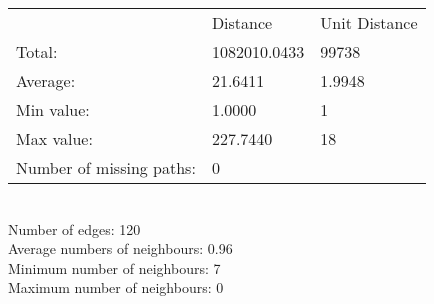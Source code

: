 \begin{tabular}{lll}
 & Distance & Unit Distance\\
Total: & 1082010.0433 & 99738\\
Average: & 21.6411 & 1.9948\\
Min value: & 1.0000 & 1\\
Max value: & 227.7440 & 18\\
\hline
Number of missing paths: & 0 &\\
\end{tabular}\\
Number of edges: 120\\
Average numbers of neighbours: 0.96\\
Minimum number of neighbours: 7\\
Maximum number of neighbours: 0\\
